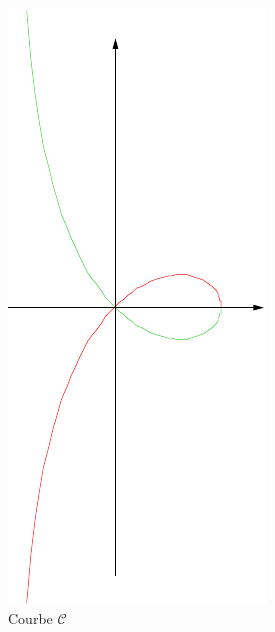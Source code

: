 

\begin{figure}[ht]
\centering
\includegraphics{Cgep4_1.pdf}
\caption{Courbe $\mathcal C$}
\label{fig:Cgep4_1}
\end{figure}
